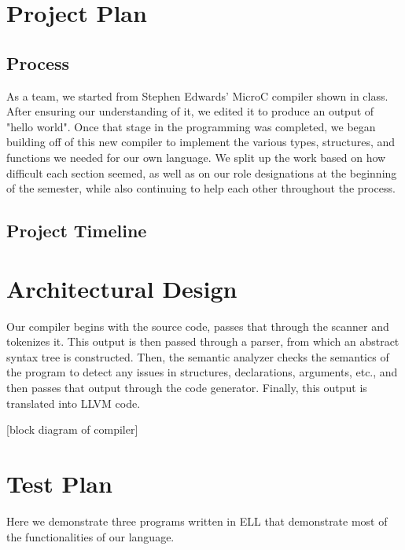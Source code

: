 \documentclass{article}
\begin{document}
\newpage
\section{Project Plan}
\subsection{Process}
As a team, we started from Stephen Edwards' MicroC compiler shown in class. After ensuring our understanding of it, we edited it to produce an output of "hello world". Once that stage in the programming was completed, we began building off of this new compiler to implement the various types, structures, and functions we needed for our own language. We split up the work based on how difficult each section seemed, as well as on our role designations at the beginning of the semester, while also continuing to help each other throughout the process.

\subsection{Project Timeline}


\newpage
\section{Architectural Design}
Our compiler begins with the source code, passes that through the scanner and tokenizes it. This output is then passed through a parser, from which an abstract syntax tree is constructed. Then, the semantic analyzer checks the semantics of the program to detect any issues in structures, declarations, arguments, etc., and then passes that output through the code generator. Finally, this output is translated into LLVM code. \newline

[block diagram of compiler]


\newpage
\section{Test Plan}
Here we demonstrate three programs written in ELL that demonstrate most of the functionalities of our language.
\end{document}
